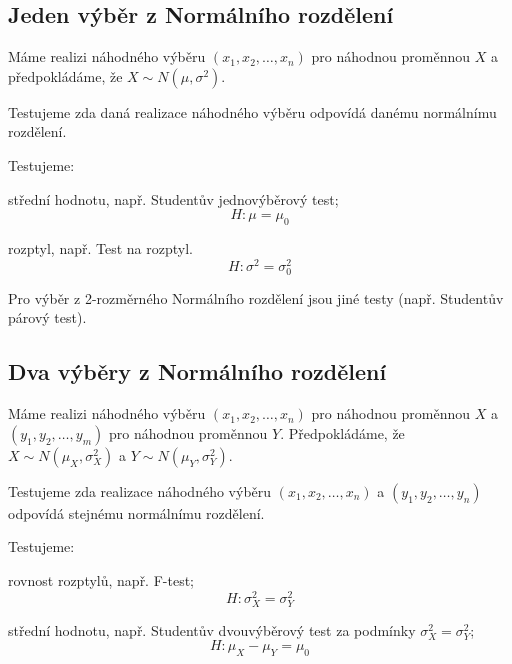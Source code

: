 \subsection{Jeden výběr z Normálního rozdělení}

\begin{compactitem}
    \item Máme realizi náhodného výběru $(x_1, x_2, \ldots, x_n)$ pro náhodnou proměnnou $X$ a předpokládáme, že $X \sim N(\mu, \sigma^2)$.

    \item Testujeme zda daná realizace náhodného výběru odpovídá danému normálnímu rozdělení.

    \item Testujeme: \begin{compactitem}
        \item střední hodnotu, např. Studentův jednovýběrový test;
        $$ H : \mu = \mu_0 $$
        \item rozptyl, např. Test na rozptyl.
        $$ H : \sigma^2 = \sigma_0^2 $$
    \end{compactitem}

    \item Pro výběr z 2-rozměrného Normálního rozdělení jsou jiné testy (např. Studentův párový test).
\end{compactitem}

\subsection{Dva výběry z Normálního rozdělení}

\begin{compactitem}
    \item Máme realizi náhodného výběru $(x_1, x_2, \ldots, x_n)$ pro náhodnou proměnnou $X$ a $(y_1, y_2, \ldots, y_m)$ pro náhodnou proměnnou $Y$. Předpokládáme, že $X \sim N(\mu_X, \sigma_X^2)$ a $Y \sim N(\mu_Y, \sigma_Y^2)$.

    \item Testujeme zda realizace náhodného výběru $(x_1, x_2, \ldots, x_n)$ a $(y_1, y_2, \ldots, y_n)$ odpovídá stejnému normálnímu rozdělení.

    \item Testujeme: \begin{compactitem}
        \item rovnost rozptylů, např. F-test;
        $$ H : \sigma_X^2 = \sigma_Y^2 $$

        \item střední hodnotu, např. Studentův dvouvýběrový test za podmínky $\sigma_X^2 = \sigma_Y^2$;
        $$ H : \mu_X - \mu_Y = \mu_0 $$

    \end{compactitem}
\end{compactitem}

